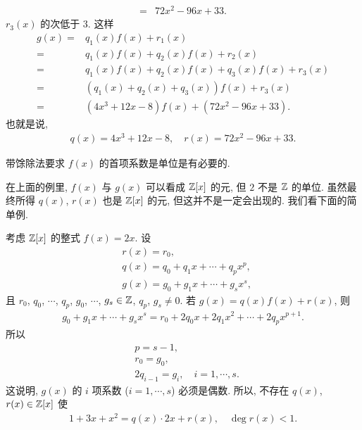 \begin{example}
\begin{align*}
        = {} & 72x^2 - 96x + 33.
    \end{align*}
    $r_3 (x)$ 的次低于 $3$. 这样
    \begin{align*}
        g(x)
        = {} & q_1 (x) f(x) + r_1 (x)                               \\
        = {} & q_1 (x) f(x) + q_2 (x) f(x) + r_2 (x)                \\
        = {} & q_1 (x) f(x) + q_2 (x) f(x) + q_3 (x) f(x) + r_3 (x) \\
        = {} & (q_1 (x) + q_2 (x) + q_3 (x)) f(x) + r_3 (x)         \\
        = {} & (4x^3 + 12x - 8) f(x) + (72x^2 - 96x + 33).
    \end{align*}
    也就是说,
    \begin{align*}
        q(x) = 4x^3 + 12x - 8, \quad r(x) = 72x^2 - 96x + 33.
    \end{align*}
\end{example}

\begin{remark}
    带馀除法要求 $f(x)$ 的首项系数是单位是有必要的.

    在上面的例里, $f(x)$ 与 $g(x)$ 可以看成 $\mathbb{Z}[x]$ 的元, 但 $2$ 不是 $\mathbb{Z}$ 的单位. 虽然最终所得 $q(x)$, $r(x)$ 也是 $\mathbb{Z}[x]$ 的元, 但这并不是一定会出现的. 我们看下面的简单例.

    考虑 $\mathbb{Z}[x]$ 的整式 $f(x)=2x$. 设
    \begin{align*}
         & r(x) = r_0,                            \\
         & q(x) = q_0 + q_1 x + \cdots + q_p x^p, \\
         & g(x) = g_0 + g_1 x + \cdots + g_s x^s,
    \end{align*}
    且 $r_0$, $q_0$, $\cdots$, $q_p$, $g_0$, $\cdots$, $g_s \in \mathbb{Z}$, $q_p$, $g_s \neq 0$. 若 $g(x) = q(x)f(x) + r(x)$, 则
    \begin{align*}
        g_0 + g_1 x + \cdots + g_s x^s = r_0 + 2q_0 x + 2q_1 x^2 + \cdots + 2q_p x^{p+1}.
    \end{align*}
    所以
    \begin{align*}
         & p = s - 1,                          \\
         & r_0 = g_0,                          \\
         & 2q_{i-1} = g_i, \quad i=1,\cdots,s.
    \end{align*}
    这说明, $g(x)$ 的 $i$ 项系数 ($i=1,\cdots,s$) 必须是偶数. 所以, 不存在 $q(x)$, $r(x) \in \mathbb{Z}[x]$ 使
    \begin{align*}
        1 + 3x + x^2 = q(x) \cdot 2x + r(x), \quad \deg r(x) < 1.
    \end{align*}
\end{remark}

